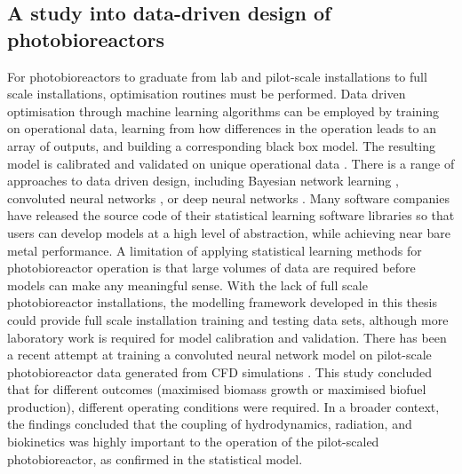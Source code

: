 \subsection{A study into data-driven design of photobioreactors}
For photobioreactors to graduate from lab and pilot-scale installations to full scale installations, optimisation routines must be performed. Data driven optimisation through machine learning algorithms can be employed by training on operational data, learning from how differences in the operation leads to an array of outputs, and building a corresponding black box model. The resulting model is calibrated and validated on unique operational data \cite{pedregosa2011}. There is a range of approaches to data driven design, including Bayesian network learning \cite{hu2018}, convoluted neural networks \cite{rio-chanona2019}, or deep neural networks \cite{deepa2018}. Many software companies have released the source code of their statistical learning software libraries so that users can develop models at a high level of abstraction, while achieving near bare metal performance.
\skippingparagraph
A limitation of applying statistical learning methods for photobioreactor operation is that large volumes of data are required before models can make any meaningful sense. With the lack of full scale photobioreactor installations, the modelling framework developed in this thesis could provide full scale installation training and testing data sets, although more laboratory work is required for model calibration and validation. There has been a recent attempt at training a convoluted neural network model on pilot-scale photobioreactor data generated from CFD simulations \cite{rio-chanona2019}. This study concluded that for different outcomes (maximised biomass growth or maximised biofuel production), different operating conditions were required. In a broader context, the findings concluded that the coupling of hydrodynamics, radiation, and biokinetics was highly important to the operation of the pilot-scaled photobioreactor, as confirmed in the statistical model. 

